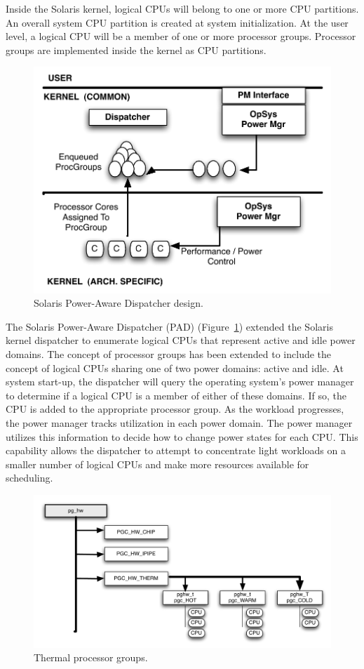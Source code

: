 \documentclass[times,10pt,onecolumn]{article}
\begin{document}
Inside the Solaris kernel, logical CPUs will belong to one or more CPU
partitions.  An overall system CPU partition is created at system
initialization.  At the user level, a logical CPU will be a member of
one or more processor groups.  Processor groups are implemented inside
the kernel as CPU partitions.
\begin{figure}
  \centering
  \includegraphics[scale=0.40]{padarch.pdf}
  \caption{Solaris Power-Aware Dispatcher design.}
  \label{fig:padarch}
\end{figure}
The Solaris Power-Aware Dispatcher (PAD) (Figure~\ref{fig:padarch})
\cite{Sun2009} extended the Solaris kernel dispatcher to enumerate
logical CPUs that represent active and idle power domains.  The concept
of processor groups has been extended to include the concept of logical
CPUs sharing one of two power domains: active and idle.  At system
start-up, the dispatcher will query the operating system's power manager
to determine if a logical CPU is a member of either of these domains.
If so, the CPU is added to the appropriate processor group.  As the
workload progresses, the power manager tracks utilization in each power
domain.  The power manager utilizes this information to decide how to
change power states for each CPU.  This capability allows the dispatcher
to attempt to concentrate light workloads on a smaller number of logical
CPUs and make more resources available for scheduling.

\begin{figure}[htbp]
  \centering
  \includegraphics[scale=0.40]{procgroup.pdf}
  \caption{Thermal processor groups.}
  \label{fig:thpg}
\end{figure}
\end{document}
